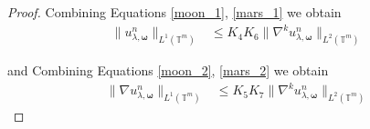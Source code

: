 \documentclass[multixcb]{amstext-l}
\theoremstyle{plain}
\theoremstyle{definition}
\theoremstyle{definition}
\theoremstyle{remark}
\numberwithin{equation}{chapter}
\begin{document}
\begin{proof}
Combining Equations \ref{moon_1}, \ref{mars_1} we obtain
\begin{equation}\begin{aligned}\label{moon_mars_1}
    \|u_{\lambda,\boldsymbol{\omega}}^n\|_{L^1(\mathbb{T}^m)} &\le K_4K_6 \|\nabla^k u_{\lambda,\boldsymbol{\omega}}^n\|_{L^2(\mathbb{T}^m)}
\end{aligned}
\end{equation}

and Combining Equations \ref{moon_2}, \ref{mars_2} we obtain
\begin{equation}\begin{aligned}\label{moon_mars_2}
    \|\nabla u_{\lambda,\boldsymbol{\omega}}^n\|_{L^1(\mathbb{T}^m)} &\le K_5K_7 \|\nabla^k u_{\lambda,\boldsymbol{\omega}}^n\|_{L^2(\mathbb{T}^m)}
\end{aligned}
\end{equation} 


\end{proof}
\end{document}
